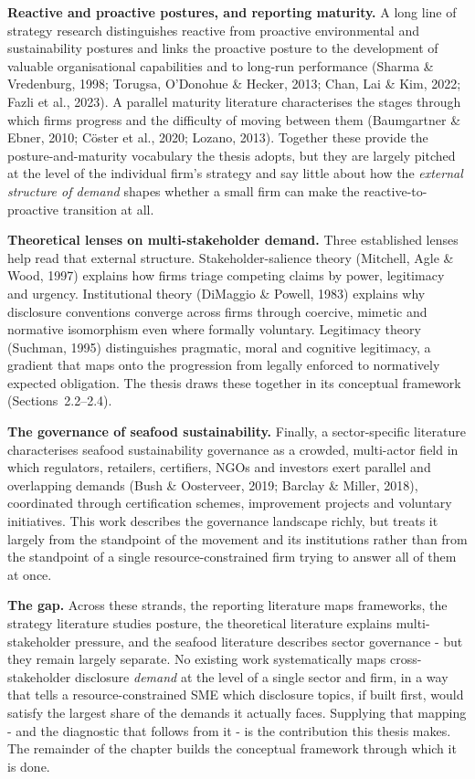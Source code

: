 \textbf{Reactive and proactive postures, and reporting maturity.} A long line of
strategy research distinguishes reactive from proactive environmental and
sustainability postures and links the proactive posture to the development of
valuable organisational capabilities and to long-run performance (Sharma \&
Vredenburg, 1998; Torugsa, O'Donohue \& Hecker, 2013; Chan, Lai \& Kim, 2022;
Fazli et al., 2023). A parallel maturity literature characterises the stages
through which firms progress and the difficulty of moving between them
(Baumgartner \& Ebner, 2010; Cöster et al., 2020; Lozano, 2013). Together these
provide the posture-and-maturity vocabulary the thesis adopts, but they are
largely pitched at the level of the individual firm's strategy and say little
about how the \emph{external structure of demand} shapes whether a small firm can
make the reactive-to-proactive transition at all.

\textbf{Theoretical lenses on multi-stakeholder demand.} Three established lenses
help read that external structure. Stakeholder-salience theory (Mitchell, Agle \&
Wood, 1997) explains how firms triage competing claims by power, legitimacy and
urgency. Institutional theory (DiMaggio \& Powell, 1983) explains why disclosure
conventions converge across firms through coercive, mimetic and normative
isomorphism even where formally voluntary. Legitimacy theory (Suchman, 1995)
distinguishes pragmatic, moral and cognitive legitimacy, a gradient that maps
onto the progression from legally enforced to normatively expected obligation.
The thesis draws these together in its conceptual framework (Sections~2.2--2.4).

\textbf{The governance of seafood sustainability.} Finally, a sector-specific
literature characterises seafood sustainability governance as a
crowded, multi-actor field in which regulators, retailers, certifiers, NGOs and
investors exert parallel and overlapping demands (Bush \& Oosterveer, 2019;
Barclay \& Miller, 2018), coordinated through certification schemes, improvement
projects and voluntary initiatives. This work describes the governance landscape richly, but treats it largely from the
standpoint of the movement and its institutions rather than from the standpoint
of a single resource-constrained firm trying to answer all of them at once.

\textbf{The gap.} Across these strands, the reporting literature maps frameworks,
the strategy literature studies posture, the theoretical literature explains
multi-stakeholder pressure, and the seafood literature describes sector
governance - but they remain largely separate. No existing work systematically
maps cross-stakeholder disclosure \emph{demand} at the level of a single sector
and firm, in a way that tells a resource-constrained SME which disclosure topics, if
built first, would satisfy the largest share of the demands it actually faces.
Supplying that mapping - and the diagnostic that follows from it - is the
contribution this thesis makes. The remainder of the chapter builds the
conceptual framework through which it is done.
